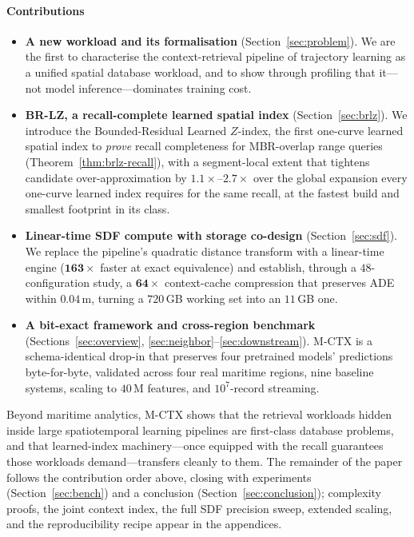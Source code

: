 \paragraph*{Contributions}
\begin{itemize}
\item[\textbf{C1}] \textbf{A new workload and its formalisation}
   (Section~\ref{sec:problem}). We are the first to characterise the
   context-retrieval pipeline of trajectory learning as a unified spatial
   database workload, and to show through profiling that it---not model
   inference---dominates training cost.

\item[\textbf{C2}] \textbf{BR-LZ, a recall-complete learned spatial
   index} (Section~\ref{sec:brlz}). We introduce the Bounded-Residual
   Learned $Z$-index, the first one-curve learned spatial index to
   \emph{prove} recall completeness for MBR-overlap range queries
   (Theorem~\ref{thm:brlz-recall}), with a segment-local extent that
   tightens candidate over-approximation by $1.1\times$--$2.7\times$ over
   the global expansion every one-curve learned index requires for the
   same recall, at the fastest build and smallest footprint in its class.

\item[\textbf{C3}] \textbf{Linear-time SDF compute with storage
   co-design} (Section~\ref{sec:sdf}). We replace the pipeline's
   quadratic distance transform with a linear-time engine
   ($\mathbf{163\times}$ faster at exact equivalence) and establish,
   through a $48$-configuration study, a $\mathbf{64\times}$ context-cache
   compression that preserves ADE within $0.04$\,m, turning a $720$\,GB
   working set into an $11$\,GB one.

\item[\textbf{C4}] \textbf{A bit-exact framework and cross-region
   benchmark} (Sections~\ref{sec:overview},
   \ref{sec:neighbor}--\ref{sec:downstream}). M-CTX is a schema-identical
   drop-in that preserves four pretrained models' predictions
   byte-for-byte, validated across four real maritime regions, nine
   baseline systems, scaling to $40$\,M features, and $10^{7}$-record
   streaming.
\end{itemize}

\noindent Beyond maritime analytics, M-CTX shows that the retrieval
workloads hidden inside large spatiotemporal learning pipelines are
first-class database problems, and that learned-index machinery---once
equipped with the recall guarantees those workloads demand---transfers
cleanly to them. The remainder of the paper follows the contribution
order above, closing with experiments (Section~\ref{sec:bench}) and a
conclusion (Section~\ref{sec:conclusion}); complexity proofs, the joint
context index, the full SDF precision sweep, extended scaling, and the
reproducibility recipe appear in the appendices.

